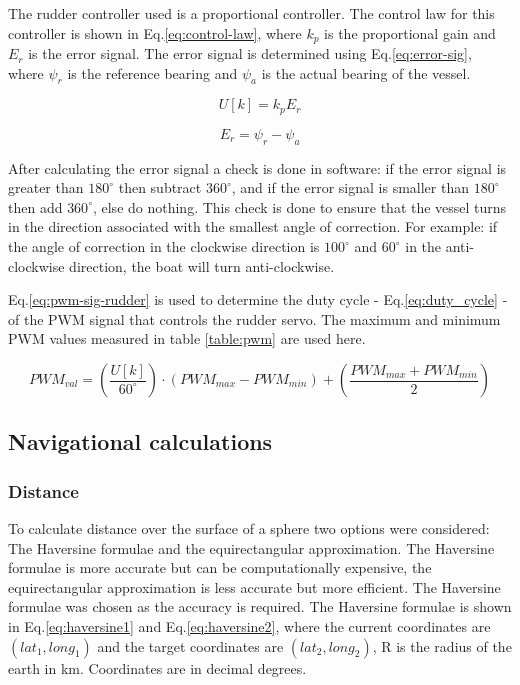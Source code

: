 The rudder controller used is a proportional controller. The control law for this controller is shown in Eq.\ref{eq:control-law}, where $k_{p}$ is the proportional gain and $E_{r}$ is the 
error signal. The error signal is determined using Eq.\ref{eq:error-sig}, where $\psi_{r}$ is the reference bearing and $\psi_{a}$ is the actual bearing of the vessel. 

\begin{equation}
    \label{eq:control-law}
    U[k] = k_{p}E_{r}
\end{equation}

\begin{equation}
    \label{eq:error-sig}
    E_{r} = \psi_{r} - \psi_{a}
\end{equation}

After calculating the error signal a check is done in software: if the error signal is greater than $180^{\circ}$ then subtract $360^{\circ}$, and if the error signal is smaller than $180^{\circ}$
then add $360^{\circ}$, else do nothing. This check is done to ensure that the vessel turns in the direction associated with the smallest angle of correction. For example: if the angle of correction
in the clockwise direction is $100^{\circ}$ and $60^{\circ}$ in the anti-clockwise direction, the boat will turn anti-clockwise.

Eq.\ref{eq:pwm-sig-rudder} is used to determine the duty cycle - Eq.\ref{eq:duty_cycle} - of the PWM signal that controls the rudder servo. The maximum and minimum PWM values measured in table \ref{table:pwm}
are used here.

\begin{equation}
    \label{eq:pwm-sig-rudder}
    PWM_{val} = \left( \frac{U[k]}{60^{\circ}} \right) \cdot (PWM_{max} - PWM_{min}) + \left( \frac{PWM_{max} + PWM_{min}}{2} \right)
\end{equation}

\subsection{Navigational calculations}
\subsubsection{Distance}
To calculate distance over the surface of a sphere two options were considered: The Haversine formulae and the equirectangular approximation. The Haversine formulae is more accurate but can be 
computationally expensive, the equirectangular approximation is less accurate but more efficient. The Haversine formulae was chosen as the accuracy is required. The Haversine formulae is shown 
in Eq.\ref{eq:haversine1} and Eq.\ref{eq:haversine2}, where
the current coordinates are $(lat_1, long_1)$ and the target coordinates are $(lat_2, long_2)$, R is the radius of the earth in km. Coordinates are in decimal degrees.

